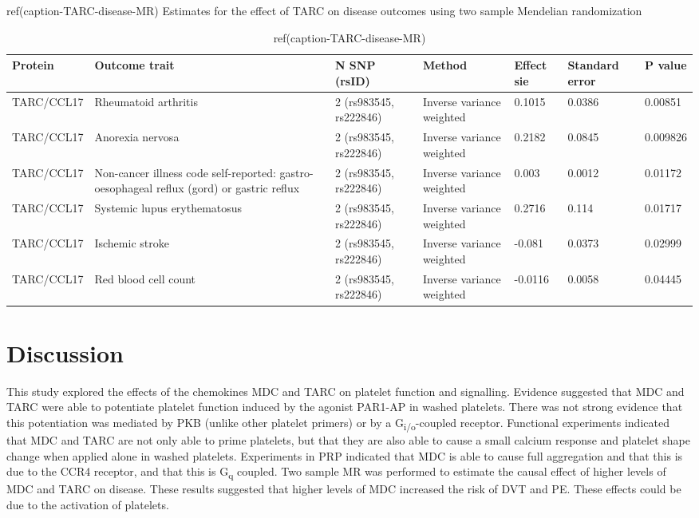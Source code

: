 \documentclass[11pt,twoside]{bristolthesis}
\begin{document}
ref(caption-TARC-disease-MR) Estimates for the effect of TARC on disease outcomes using two sample Mendelian randomization
\begin{landscape}\begin{table}

\caption{\label{tab:TARC-disease-MR}ref(caption-TARC-disease-MR)}
\centering
\fontsize{10}{12}\selectfont
\begin{tabu} to 
\toprule
Protein & Outcome trait & N SNP (rsID) & Method & Effect sie & Standard error & P value\\
\midrule
TARC/CCL17 & Rheumatoid arthritis & 2 (rs983545, rs222846) & Inverse variance weighted & 0.1015 & 0.0386 & 0.00851\\
TARC/CCL17 & Anorexia nervosa & 2 (rs983545, rs222846) & Inverse variance weighted & 0.2182 & 0.0845 & 0.009826\\
TARC/CCL17 & Non-cancer illness code self-reported: gastro-oesophageal reflux (gord) or gastric reflux & 2 (rs983545, rs222846) & Inverse variance weighted & 0.003 & 0.0012 & 0.01172\\
TARC/CCL17 & Systemic lupus erythematosus & 2 (rs983545, rs222846) & Inverse variance weighted & 0.2716 & 0.114 & 0.01717\\
TARC/CCL17 & Ischemic stroke & 2 (rs983545, rs222846) & Inverse variance weighted & -0.081 & 0.0373 & 0.02999\\
\addlinespace
TARC/CCL17 & Red blood cell count & 2 (rs983545, rs222846) & Inverse variance weighted & -0.0116 & 0.0058 & 0.04445\\
\bottomrule
\end{tabu}
\end{table}
\end{landscape}
\hypertarget{discussion-2}{%
\section{Discussion}\label{discussion-2}}

This study explored the effects of the chemokines MDC and TARC on platelet function and signalling. Evidence suggested that MDC and TARC were able to potentiate platelet function induced by the agonist PAR1-AP in washed platelets. There was not strong evidence that this potentiation was mediated by PKB (unlike other platelet primers) or by a G\textsubscript{i/o}-coupled receptor. Functional experiments indicated that MDC and TARC are not only able to prime platelets, but that they are also able to cause a small calcium response and platelet shape change when applied alone in washed platelets. Experiments in PRP indicated that MDC is able to cause full aggregation and that this is due to the CCR4 receptor, and that this is G\textsubscript{q} coupled. Two sample MR was performed to estimate the causal effect of higher levels of MDC and TARC on disease. These results suggested that higher levels of MDC increased the risk of DVT and PE. These effects could be due to the activation of platelets.
\end{document}

